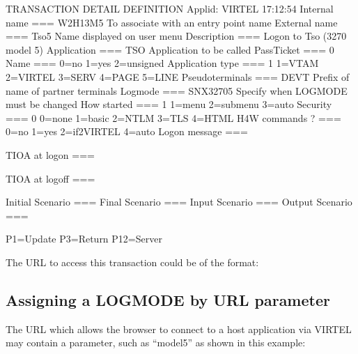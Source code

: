 \documentclass[letterpaper,10pt,english]{sphinxmanual}
\begin{document}
\begin{sphinxVerbatim}[commandchars=\\\{\}]
TRANSACTION DETAIL DEFINITION \PYGZhy{}\PYGZhy{}\PYGZhy{}\PYGZhy{}\PYGZhy{}\PYGZhy{}\PYGZhy{}\PYGZhy{}\PYGZhy{}\PYGZhy{}\PYGZhy{}\PYGZhy{}\PYGZhy{}\PYGZhy{}\PYGZhy{}\PYGZhy{}\PYGZhy{}\PYGZhy{}\PYGZhy{}\PYGZhy{}\PYGZhy{}\PYGZhy{} Applid: VIRTEL 17:12:54
Internal name ===\PYGZgt{} W2H\PYGZhy{}13M5             To associate with an entry point name
External name ===\PYGZgt{} Tso5                 Name displayed on user menu
Description   ===\PYGZgt{} Logon to Tso (3270 model 5)
Application   ===\PYGZgt{} TSO                  Application to be called
PassTicket    ===\PYGZgt{} 0 Name ===\PYGZgt{}          0=no 1=yes 2=unsigned
Application type ===\PYGZgt{} 1                 1=VTAM 2=VIRTEL 3=SERV 4=PAGE 5=LINE
Pseudo\PYGZhy{}terminals ===\PYGZgt{} DEVT              Prefix of name of partner terminals
Logmode          ===\PYGZgt{} SNX32705          Specify when LOGMODE must be changed
How started      ===\PYGZgt{} 1                 1=menu 2=sub\PYGZhy{}menu 3=auto
Security         ===\PYGZgt{} 0                 0=none 1=basic 2=NTLM 3=TLS 4=HTML
H4W commands ?   ===\PYGZgt{}                   0=no 1=yes 2=if2VIRTEL 4=auto
Logon message    ===\PYGZgt{}

TIOA at logon    ===\PYGZgt{}

TIOA at logoff   ===\PYGZgt{}

Initial Scenario ===\PYGZgt{}                   Final Scenario  ===\PYGZgt{}
Input Scenario   ===\PYGZgt{}                   Output Scenario ===\PYGZgt{}

P1=Update                         P3=Return                          P12=Server
\end{sphinxVerbatim}


The URL to access this transaction could be of the format:

\begin{sphinxVerbatim}[commandchars=\\\{\}]
\end{sphinxVerbatim}


\subsection{Assigning a LOGMODE by URL parameter}
\label{\detokenize{User_Guide:assigning-a-logmode-by-url-parameter}}
The URL which allows the browser to connect to a host application via VIRTEL may contain a parameter, such as “model5” as shown in this example:
\end{document}
